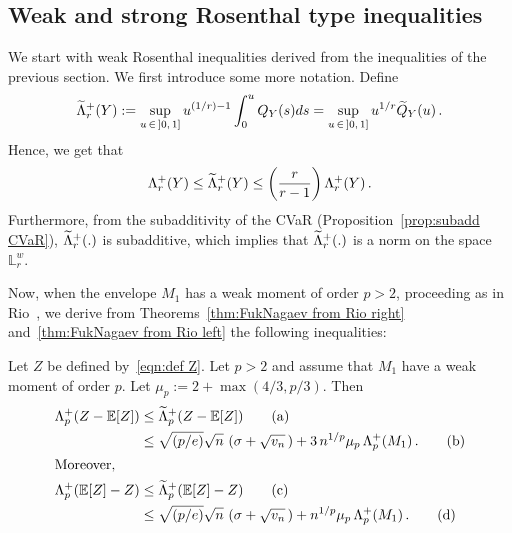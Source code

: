 \documentclass[AHL,Unicode,longabstracts,published]{cedram}
\newcommand{\bE}{\mathbb{E}}
\newcommand{\bL}{\mathbb{L}}
\let\oldtilde\tilde
\renewcommand*{\tilde}[1]{\mathchoice{\widetilde{#1}}{\widetilde{#1}}{\oldtilde{#1}}{\oldtilde{#1}}}
\begin{document}
\subsection{Weak and strong Rosenthal type inequalities}

We start with weak Rosenthal inequalities derived from the inequalities of the previous section. We first introduce some more notation. Define
\begin{equation}\label{eqn:def weak norm tilde}
\tilde{\Lambda}_r^+(Y):=\sup_{u\,\in\,]0,\,1]} u^{(1/r)-1}\int_0^u Q_Y(s)ds=\sup_{u\,\in\,]0,\,1]} u^{1/r}\tilde Q_Y(u)\,.
\end{equation}
Hence, we get that
\begin{equation}\label{eqn:bound Lambda by tildeLambda}
\Lambda_r^+(Y)\leq\tilde\Lambda_r^+(Y)\leq\left(\frac{r}{r-1}\right)\Lambda_r^+(Y)\,.
\end{equation}
Furthermore, from the subadditivity of the CVaR (Proposition~\ref{prop:subadd CVaR}), $\tilde\Lambda_r^+(.)$ is subadditive, which implies that $\tilde\Lambda_r^+(.)$ is a norm on the space $\bL_r^w$.

Now, when the envelope $M_1$ has a weak moment of order $p>2$, proceeding as in Rio~\cite{Rio17a}, we derive from Theorems~\ref{thm:FukNagaev from Rio right} and~\ref{thm:FukNagaev from Rio left} the following inequalities:

\begin{coro}\label{cor:weak moment ineq from Rio}
Let $Z$ be defined by~\eqref{eqn:def Z}. Let $p>2$ and assume that $M_1$ have a weak moment of order $p$. Let $\mu_p:=2+\max(4/3, p/3)$. Then
\begin{align*}
\Lambda_p^+(Z-\bE[Z])&\leq\tilde\Lambda_p^+(Z-\bE[Z])\tag{$\rm a$}\label{coro2.6.a}\\
&\leq \sqrt{(p/e)}\sqrt n\,\left(\sigma+\sqrt{v_n}\,\right)+3\,n^{1/p}\mu_p\,\Lambda_p^+ (M_1)\,.\tag{$\rm b$}\label{coro2.6.b}
\\
\intertext{Moreover,}
\Lambda_p^+(\bE[Z]-Z)&\leq \tilde\Lambda_p^+(\bE[Z]-Z)\tag{$\rm c$}\label{coro2.6.c}\\
&\leq \sqrt{(p/e)}\sqrt n\,\left(\sigma+\sqrt{v_n}\,\right)+n^{1/p}\mu_p\,\Lambda_p^+(M_1)\,.\tag{$\rm d$}\label{coro2.6.d}
\end{align*}
\end{coro}
\end{document}
